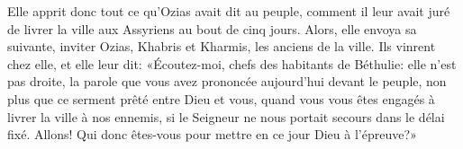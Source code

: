 Elle apprit donc tout ce qu'Ozias avait dit au peuple,
	comment il leur avait juré de livrer la ville aux Assyriens au bout de cinq jours.
Alors, elle envoya sa suivante,
	inviter Ozias, Khabris et Kharmis, les anciens de la ville.
Ils vinrent chez elle, et elle leur dit:
	«Écoutez-moi, chefs des habitants de Béthulie:
	elle n'est pas droite, la parole que vous avez prononcée aujourd'hui devant le peuple,
	non plus que ce serment prêté entre Dieu et vous,
	quand vous vous êtes engagés à livrer la ville à nos ennemis,
	si le Seigneur ne nous portait secours dans le délai fixé.
Allons! Qui donc êtes-vous pour mettre en ce jour Dieu à l'épreuve?»
